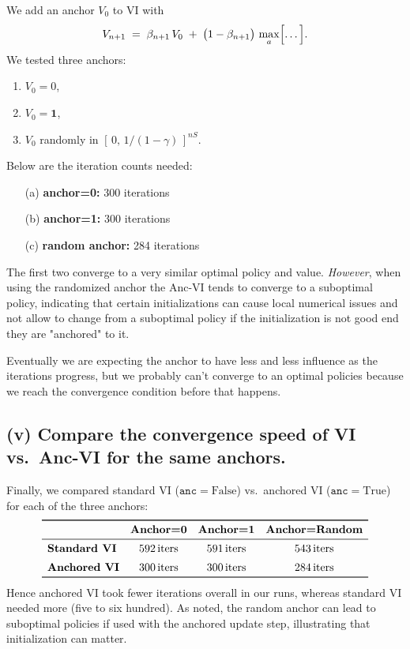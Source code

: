 \noindent
We add an anchor \(V_0\) to VI with
\[
  V_{n+1}
  \;=\;\beta_{n+1}\,V_0 \;+\;\bigl(1-\beta_{n+1}\bigr)\,\max_{a}\Bigl[\dots\Bigr].
\]
We tested three anchors:
\begin{enumerate}[label=(\alph*)]
\item $V_0=0$,
\item $V_0=\mathbf{1}$,
\item $V_0$ randomly in $[\,0,\,1/(1-\gamma)\,]^{nS}$.
\end{enumerate}
Below are the iteration counts needed:
\begin{itemize}
  \item[(a)] \textbf{anchor=0:} 300 iterations
  \item[(b)] \textbf{anchor=1:} 300 iterations
  \item[(c)] \textbf{random anchor:} 284 iterations
\end{itemize}
The first two converge to a very similar optimal policy and value.  
\emph{However}, when using the randomized anchor the Anc-VI tends to converge to a suboptimal policy,
indicating that certain initializations can cause local numerical issues and not allow to change from
a suboptimal policy if the initialization is not good end they are "anchored" to it.

Eventually we are expecting the anchor to have less and less influence as the iterations progress, but
we probably can't converge to an optimal policies because we reach the convergence condition before that happens.

\subsection*{(v) Compare the convergence speed of VI vs.\ Anc-VI for the same anchors.}

\noindent
Finally, we compared standard VI ($\mathtt{anc}=\text{False}$) vs.\ anchored VI ($\mathtt{anc}=\text{True}$) 
for each of the three anchors:
\[
  \begin{array}{lccc}
  \toprule
  & \textbf{Anchor=0} & \textbf{Anchor=1} & \textbf{Anchor=Random} \\
  \midrule
  \textbf{Standard VI} & 592\,\text{iters} & 591\,\text{iters} & 543\,\text{iters} \\[5pt]
  \textbf{Anchored VI} & 300\,\text{iters} & 300\,\text{iters} & 284\,\text{iters} \\
  \bottomrule
  \end{array}
\]
Hence anchored VI took fewer iterations overall in our runs, whereas standard VI needed more 
(five to six hundred).  As noted, the random anchor can lead to suboptimal policies if used 
with the anchored update step, illustrating that initialization can matter.